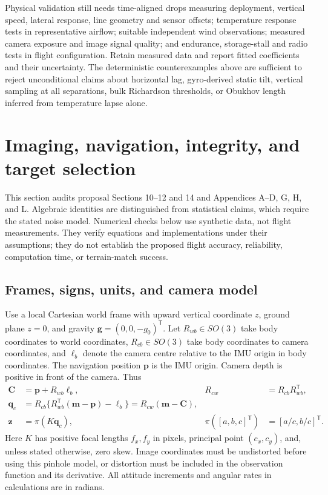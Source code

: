 \documentclass[11pt,a4paper]{article}
\numberwithin{equation}{section}
\begin{document}
Physical validation still needs time-aligned drops measuring deployment,
vertical speed, lateral response, line geometry and sensor offsets;
temperature response tests in representative airflow; suitable independent
wind observations; measured camera exposure and image signal quality;
and endurance, storage-stall and radio tests in flight configuration.
Retain measured data and report fitted coefficients and their uncertainty.
The deterministic counterexamples above are sufficient to reject
unconditional claims about horizontal lag, gyro-derived static tilt,
vertical sampling at all separations, bulk Richardson thresholds, or
Obukhov length inferred from temperature lapse alone.


\section{Imaging, navigation, integrity, and target selection}
\label{sec:navigation-maths}

This section audits proposal Sections 10--12 and 14 and Appendices
A--D, G, H, and L. Algebraic identities are distinguished from statistical
claims, which require the stated noise model. Numerical checks below use
synthetic data, not flight measurements. They verify equations and
implementations under their assumptions; they do not establish the proposed
flight accuracy, reliability, computation time, or terrain-match success.

\subsection{Frames, signs, units, and camera model}

Use a local Cartesian world frame with upward vertical coordinate $z$,
ground plane $z=0$, and gravity $\boldsymbol g=(0,0,-g_0)^{\mathsf T}$.
Let $R_{wb}\in SO(3)$ take body coordinates to world coordinates,
$R_{cb}\in SO(3)$ take body coordinates to camera coordinates, and
$\boldsymbol\ell_b$ denote the camera centre relative to the IMU origin in
body coordinates. The navigation position $\boldsymbol p$ is the IMU
origin. Camera depth is positive in front of the camera. Thus
\begin{align}
 \boldsymbol C&=\boldsymbol p+R_{wb}\boldsymbol\ell_b,
 &R_{cw}&=R_{cb}R_{wb}^{\mathsf T},\\
 \boldsymbol q_c&=R_{cb}\{R_{wb}^{\mathsf T}(\boldsymbol m-\boldsymbol p)
                         -\boldsymbol\ell_b\}
                 =R_{cw}(\boldsymbol m-\boldsymbol C),\\
 \boldsymbol z&=\pi(K\boldsymbol q_c),
 &\pi([a,b,c]^{\mathsf T})&=[a/c,b/c]^{\mathsf T}.
 \label{eq:full-camera}
\end{align}
Here $K$ has positive focal lengths $f_x,f_y$ in pixels, principal point
$(c_x,c_y)$, and, unless stated otherwise, zero skew. Image coordinates
must be undistorted before using this pinhole model, or distortion must be
included in the observation function and its derivative. All attitude
increments and angular rates in calculations are in radians.
\end{document}
